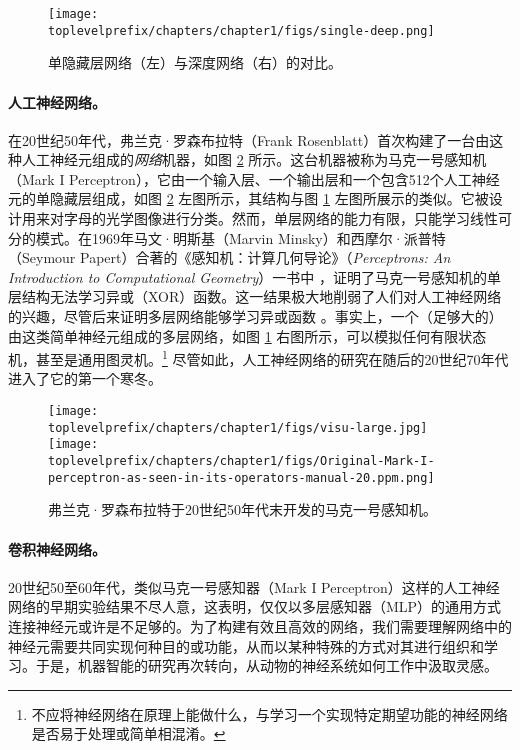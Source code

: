 \documentclass[../../book-main.tex]{subfiles}
\begin{document}
\begin{figure}[t]
\centering
\texttt{[image: \\toplevelprefix/chapters/chapter1/figs/single-deep.png]}
    \caption{单隐藏层网络（左）与深度网络（右）的对比。}
    \label{fig:single-deep}
\end{figure}
\paragraph{人工神经网络。}
在20世纪50年代，弗兰克·罗森布拉特（Frank Rosenblatt）首次构建了一台由这种人工神经元组成的{\em 网络}机器，如图 \ref{fig:perceptron} 所示。这台机器被称为马克一号感知机（Mark I Perceptron），它由一个输入层、一个输出层和一个包含512个人工神经元的单隐藏层组成，如图 \ref{fig:perceptron} 左图所示，其结构与图 \ref{fig:single-deep} 左图所展示的类似。它被设计用来对字母的光学图像进行分类。然而，单层网络的能力有限，只能学习线性可分的模式。在1969年马文·明斯基（Marvin Minsky）和西摩尔·派普特（Seymour Papert）合著的《感知机：计算几何导论》（{\em Perceptrons: An Introduction to Computational Geometry}）一书中 \cite{Minsky-1969}，证明了马克一号感知机的单层结构无法学习异或（XOR）函数。这一结果极大地削弱了人们对人工神经网络的兴趣，尽管后来证明多层网络能够学习异或函数 \cite{Rumelhart1986}。事实上，一个（足够大的）由这类简单神经元组成的多层网络，如图 \ref{fig:single-deep} 右图所示，可以模拟任何有限状态机，甚至是通用图灵机。\footnote{不应将神经网络在原理上能做什么，与学习一个实现特定期望功能的神经网络是否易于处理或简单相混淆。} 尽管如此，人工神经网络的研究在随后的20世纪70年代进入了它的第一个寒冬。

\begin{figure}
    \centering
    \texttt{[image: \\toplevelprefix/chapters/chapter1/figs/visu-large.jpg]}
    \hspace{2mm} \texttt{[image: \\toplevelprefix/chapters/chapter1/figs/Original-Mark-I-perceptron-as-seen-in-its-operators-manual-20.ppm.png]}
    \caption{弗兰克·罗森布拉特于20世纪50年代末开发的马克一号感知机。}
    \label{fig:perceptron}
\end{figure}


\paragraph{卷积神经网络。}

20世纪50至60年代，类似马克一号感知器（Mark I Perceptron）这样的人工神经网络的早期实验结果不尽人意，这表明，仅仅以多层感知器（MLP）的通用方式连接神经元或许是不足够的。为了构建有效且高效的网络，我们需要理解网络中的神经元需要共同实现何种目的或功能，从而以某种特殊的方式对其进行组织和学习。于是，机器智能的研究再次转向，从动物的神经系统如何工作中汲取灵感。
\end{document}

